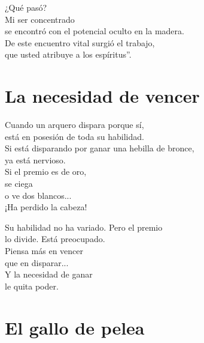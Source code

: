 \documentclass[hidelinks]{memoir}
\begin{document}
	¿Qué pasó?\\
	Mi ser concentrado\\
	se encontró con el potencial oculto en la madera.\\
	De este encuentro vital surgió el trabajo,\\
	que usted atribuye a los espíritus''.
	
	\chapter*{La necesidad de vencer}
	
	Cuando un arquero dispara porque sí,\\
	está en posesión de toda su habilidad.\\
	Si está disparando por ganar una hebilla de bronce,\\
	ya está nervioso.\\
	Si el premio es de oro,\\
	se ciega\\
	o ve dos blancos...\\
	¡Ha perdido la cabeza!
	
	Su habilidad no ha variado. Pero el premio\\
	lo divide. Está preocupado.\\
	Piensa más en vencer\\
	que en disparar...\\
	Y la necesidad de ganar\\
	le quita poder.
	
	\chapter*{El gallo de pelea}
	
\end{document}
